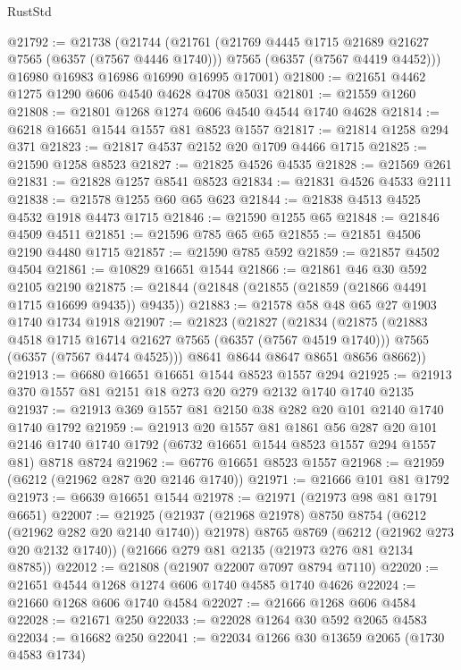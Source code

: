 \begin{lexlean}{RustStd}
\begin{coremodule}
@21792 := @21738
    (@21744
      (@21761
        (@21769 @4445 @1715 @21689 @21627 @7565 (@6357 (@7567 @4446 @1740)))
        @7565
        (@6357 (@7567 @4419 @4452)))
      @16980
      @16983
      @16986
      @16990
      @16995
      @17001)
@21800 := @21651 @4462 @1275 @1290 @606 @4540 @4628 @4708 @5031
@21801 := @21559 @1260
@21808 := @21801 @1268 @1274 @606 @4540 @4544 @1740 @4628
@21814 := @6218 @16651 @1544 @1557 @81 @8523 @1557
@21817 := @21814 @1258 @294 @371
@21823 := @21817 @4537 @2152 @20 @1709 @4466 @1715
@21825 := @21590 @1258 @8523
@21827 := @21825 @4526 @4535
@21828 := @21569 @261
@21831 := @21828 @1257 @8541 @8523
@21834 := @21831 @4526 @4533 @2111
@21838 := @21578 @1255 @60 @65 @623
@21844 := @21838 @4513 @4525 @4532 @1918 @4473 @1715
@21846 := @21590 @1255 @65
@21848 := @21846 @4509 @4511
@21851 := @21596 @785 @65 @65
@21855 := @21851 @4506 @2190 @4480 @1715
@21857 := @21590 @785 @592
@21859 := @21857 @4502 @4504
@21861 := @10829 @16651 @1544
@21866 := @21861 @46 @30 @592 @2105 @2190
@21875 := @21844 (@21848 (@21855 (@21859 (@21866 @4491 @1715 @16699 @9435)) @9435))
@21883 := @21578 @58 @48 @65 @27 @1903 @1740 @1734 @1918
@21907 := @21823
    (@21827
      (@21834
        (@21875
          (@21883 @4518 @1715 @16714 @21627 @7565 (@6357 (@7567 @4519 @1740)))
          @7565
          (@6357 (@7567 @4474 @4525)))
        @8641
        @8644
        @8647
        @8651
        @8656
        @8662))
@21913 := @6680 @16651 @16651 @1544 @8523 @1557 @294
@21925 := @21913 @370 @1557 @81 @2151 @18 @273 @20 @279 @2132 @1740 @1740 @2135
@21937 := @21913 @369 @1557 @81 @2150 @38 @282 @20 @101 @2140 @1740 @1740 @1792
@21959 := @21913
    @20
    @1557
    @81
    @1861
    @56
    @287
    @20
    @101
    @2146
    @1740
    @1740
    @1792
    (@6732 @16651 @1544 @8523 @1557 @294 @1557 @81)
    @8718
    @8724
@21962 := @6776 @16651 @8523 @1557
@21968 := @21959 (@6212 (@21962 @287 @20 @2146 @1740))
@21971 := @21666 @101 @81 @1792
@21973 := @6639 @16651 @1544
@21978 := @21971 (@21973 @98 @81 @1791 @6651)
@22007 := @21925
    (@21937 (@21968 @21978) @8750 @8754 (@6212 (@21962 @282 @20 @2140 @1740)) @21978)
    @8765
    @8769
    (@6212 (@21962 @273 @20 @2132 @1740))
    (@21666 @279 @81 @2135 (@21973 @276 @81 @2134 @8785))
@22012 := @21808 (@21907 @22007 @7097 @8794 @7110)
@22020 := @21651 @4544 @1268 @1274 @606 @1740 @4585 @1740 @4626
@22024 := @21660 @1268 @606 @1740 @4584
@22027 := @21666 @1268 @606 @4584
@22028 := @21671 @250
@22033 := @22028 @1264 @30 @592 @2065 @4583
@22034 := @16682 @250
@22041 := @22034 @1266 @30 @13659 @2065 (@1730 @4583 @1734)

\end{coremodule}
\end{lexlean}
